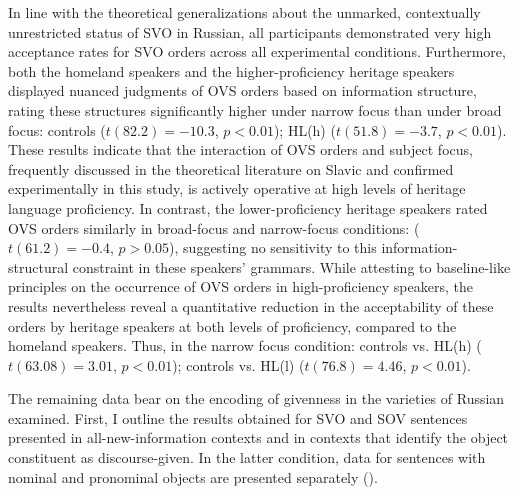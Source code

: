 \documentclass[output=paper]{langscibook}
\begin{document}
In line with the theoretical generalizations about the unmarked, contextually unrestricted status of SVO in Russian, all participants demonstrated very high acceptance rates for SVO orders across all experimental conditions. Furthermore, both the homeland speakers and the higher-proficiency heritage speakers displayed nuanced judgments of OVS orders based on information structure, rating these structures significantly higher under narrow focus than under broad focus: controls ($t(82.2)=-10.3$, $p<0.01$); HL(h) ($t(51.8)=-3.7$, $p<0.01$). These results indicate that the interaction of OVS orders and subject focus, frequently discussed in the theoretical literature on Slavic and confirmed experimentally in this study, is actively operative at high levels of heritage language proficiency. In contrast, the lower-proficiency heritage speakers rated OVS orders similarly in broad-focus and narrow-focus conditions: ($t(61.2)=-0.4$, $p>0.05$), suggesting no sensitivity to this information-structural constraint in these speakers’ grammars. While attesting to baseline-like principles on the occurrence of OVS orders in high-proficiency speakers, the results nevertheless reveal a quantitative reduction in the acceptability of these orders by heritage speakers at both levels of proficiency, compared to the homeland speakers. Thus, in the narrow focus condition: controls vs. HL(h) ($t(63.08)=3.01$, $p<0.01$); controls vs. HL(l) ($t(76.8)=4.46$, $p<0.01$). 

The remaining data bear on the encoding of givenness in the varieties of Russian examined. First, I outline the results obtained for SVO and SOV sentences presented in all-new-information contexts and in contexts that identify the object constituent as discourse-given. In the latter condition, data for sentences with nominal and pronominal objects are presented separately ().
\end{document}
